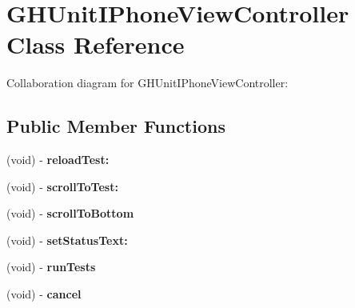 \hypertarget{interface_g_h_unit_i_phone_view_controller}{
\section{\-G\-H\-Unit\-I\-Phone\-View\-Controller \-Class \-Reference}
\label{interface_g_h_unit_i_phone_view_controller}
}


\-Collaboration diagram for \-G\-H\-Unit\-I\-Phone\-View\-Controller\-:
\subsection*{\-Public \-Member \-Functions}
\begin{DoxyCompactItemize}
\item 
\hypertarget{interface_g_h_unit_i_phone_view_controller_ade4a0bc403a47a456788598176eabcba}{
(void) -\/ {\bfseries reload\-Test\-:}}
\label{interface_g_h_unit_i_phone_view_controller_ade4a0bc403a47a456788598176eabcba}

\item 
\hypertarget{interface_g_h_unit_i_phone_view_controller_a65f9c2fb58fe6d3978fa6735b4cd2255}{
(void) -\/ {\bfseries scroll\-To\-Test\-:}}
\label{interface_g_h_unit_i_phone_view_controller_a65f9c2fb58fe6d3978fa6735b4cd2255}

\item 
\hypertarget{interface_g_h_unit_i_phone_view_controller_a7b59b78400a779e52f228f47fb6e6831}{
(void) -\/ {\bfseries scroll\-To\-Bottom}}
\label{interface_g_h_unit_i_phone_view_controller_a7b59b78400a779e52f228f47fb6e6831}

\item 
\hypertarget{interface_g_h_unit_i_phone_view_controller_a7eff0ce1c1b3aeb150969295e00fb18c}{
(void) -\/ {\bfseries set\-Status\-Text\-:}}
\label{interface_g_h_unit_i_phone_view_controller_a7eff0ce1c1b3aeb150969295e00fb18c}

\item 
\hypertarget{interface_g_h_unit_i_phone_view_controller_a767f5deca724803485ec0e7b2f0a9739}{
(void) -\/ {\bfseries run\-Tests}}
\label{interface_g_h_unit_i_phone_view_controller_a767f5deca724803485ec0e7b2f0a9739}

\item 
\hypertarget{interface_g_h_unit_i_phone_view_controller_a8d0bc1530ed490d6081869d07de472cd}{
(void) -\/ {\bfseries cancel}}
\label{interface_g_h_unit_i_phone_view_controller_a8d0bc1530ed490d6081869d07de472cd}


\end{DoxyCompactItemize}
